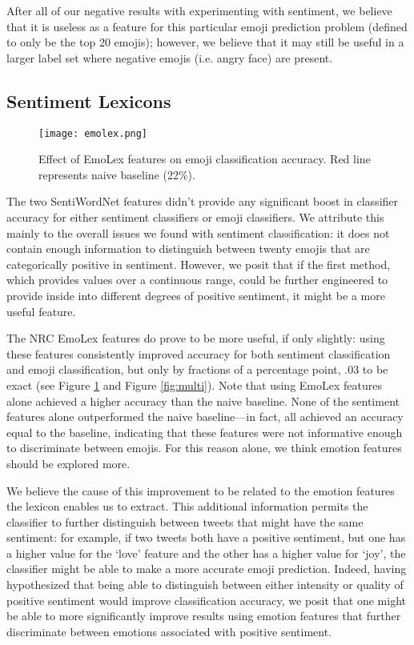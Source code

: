 \documentclass[11pt]{article}
\begin{document}
After all of our negative results with experimenting with sentiment, we believe that it is useless as a feature for this particular emoji prediction problem (defined to only be the top 20 emojis); however, we believe that it may still be useful in a larger label set where negative emojis (i.e. angry face) are present.

\subsection{Sentiment Lexicons}
\begin{figure}
    \centering
    \texttt{[image: emolex.png]}
    \caption{Effect of EmoLex features on emoji classification accuracy. Red line represents naive baseline (22\%).}
    \label{fig:emolex}
\end{figure}

The two SentiWordNet features didn't provide any significant boost in classifier accuracy for either sentiment classifiers or emoji classifiers. We attribute this mainly to the overall issues we found with sentiment classification: it does not contain enough information to distinguish between twenty emojis that are categorically positive in sentiment. However, we posit that if the first method, which provides values over a continuous range, could be further engineered to provide inside into different degrees of positive sentiment, it might be a more useful feature.

The NRC EmoLex features do prove to be more useful, if only slightly: using these features consistently improved accuracy for both sentiment classification and emoji classification, but only by fractions of a percentage point, .03 to be exact (see Figure \ref{fig:emolex} and Figure \ref{fig:multi}). Note that using EmoLex features alone achieved a higher accuracy than the naive baseline. None of the sentiment features alone outperformed the naive baseline—in fact, all achieved an accuracy equal to the baseline, indicating that these features were not informative enough to discriminate between emojis. For this reason alone, we think emotion features should be explored more.

We believe the cause of this improvement to be related to the emotion features the lexicon enables us to extract. This additional information permits the classifier to further distinguish between tweets that might have the same sentiment: for example, if two tweets both have a positive sentiment, but one has a higher value for the `love' feature and the other has a higher value for `joy', the classifier might be able to make a more accurate emoji prediction. Indeed, having hypothesized that being able to distinguish between either intensity or quality of positive sentiment would improve classification accuracy, we posit that one might be able to more significantly improve results using emotion features that further discriminate between emotions associated with positive sentiment.
\end{document}
